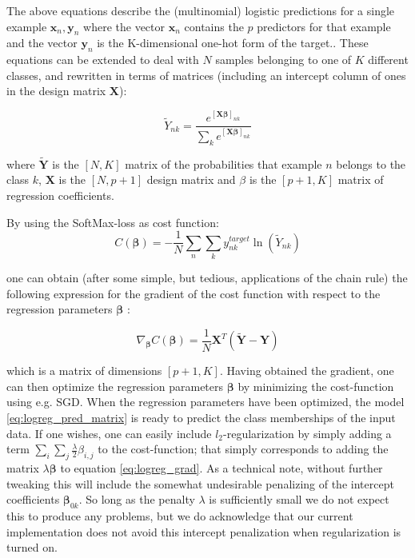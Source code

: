 \documentclass[reprint, english, nofootinbib]{revtex4-2}
\begin{document}
The above equations describe the (multinomial) logistic predictions for a single example $\mathbf{x}_n, \mathbf{y}_n$ where the vector $\mathbf{x}_n$ contains the $p$ predictors for that example and the vector $\mathbf{y}_n$ is the K-dimensional one-hot form of the target.. These equations can be extended to deal with $N$ samples belonging to one of $K$ different classes, and rewritten in terms of matrices (including an intercept column of ones in the design matrix $\mathbf{X}$):

\begin{equation}
\label{eq:logreg_pred_matrix}
\tilde{Y}_{nk} = \frac{ e^{[\mathbf{X} \mathbf{\beta}]_{nk}}} { \sum_k e^{[\mathbf{X} \mathbf{\beta}]_{nk}} }
\end{equation}

where $\mathbf{\tilde{Y}}$ is the $[N,K]$ matrix of the probabilities that example $n$ belongs to the class $k$, $\mathbf{X}$ is the $[N,p+1]$ design matrix and $\mathbb{\beta}$ is the $[p+1,K]$ matrix of regression coefficients.

By using the SoftMax-loss as cost function:
\begin{equation}
\label{eq:logreg_cost}
C(\mathbf{\beta}) = - \frac{1}{N} \sum_n \sum_k y^{target}_{nk}  \ln (\tilde{Y}_{nk})
\end{equation}

one can obtain (after some simple, but tedious, applications of the chain rule) the following expression for the gradient of the cost function with respect to the regression parameters $\mathbf{\beta}$ :

 \begin{equation}
\label{eq:logreg_grad}
\nabla_{\mathbf{\beta}} C(\mathbf{\beta}) = \frac{1}{N} \mathbf{X}^T (\mathbf{\tilde{Y}} - \mathbf{Y} )
\end{equation}

which is a matrix of dimensions $[p+1, K]$. Having obtained the gradient, one can then optimize the regression parameters $\mathbf{\beta}$ by minimizing the cost-function using e.g. SGD. When the regression parameters have been optimized, the model \ref{eq:logreg_pred_matrix} is ready to predict the class memberships of the input data. If one wishes, one can easily include $l_2$-regularization by simply adding a term $\sum_{i} \sum_{j} \frac{\lambda}{2} \beta_{i,j}$ to the cost-function; that simply corresponds to adding the matrix $\lambda \mathbf{\beta}$ to equation \ref{eq:logreg_grad}. As a technical note, without further tweaking this will include the somewhat undesirable penalizing of the intercept coefficients $\mathbf{\beta}_{0k}$. So long as the penalty $\lambda$ is sufficiently small we do not expect this to produce any problems, but we do acknowledge that our current implementation does not avoid this intercept penalization when regularization is turned on.
\end{document}
